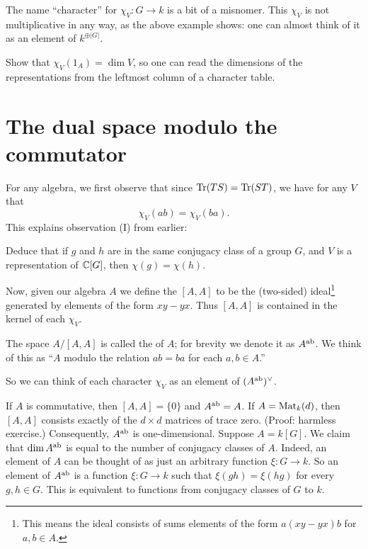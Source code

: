 \begin{abuse}
	The name ``character'' for $\chi_V : G \to k$ is a bit of a misnomer.
	This $\chi_V$ is not multiplicative in any way,
	as the above example shows: one can almost think of it as
	an element of $k^{\oplus |G|}$.
\end{abuse}

\begin{ques}
	Show that $\chi_V(1_A) = \dim V$,
	so one can read the dimensions of the representations
	from the leftmost column of a character table.
\end{ques}

\section{The dual space modulo the commutator}
For any algebra, we first observe that since $\operatorname{Tr}(TS) = \operatorname{Tr}(ST)$,
we have for any $V$ that
\[ \chi_V(ab) = \chi_V(ba). \]
This explains observation (I) from earlier:
\begin{ques}
	Deduce that if $g$ and $h$ are in the same conjugacy class of a 
	group $G$, and $V$ is a representation of $\mathbb C[G]$,
	then $\chi(g) = \chi(h)$.
\end{ques}
Now, given our algebra $A$ we define the  $[A,A]$
to be the (two-sided) ideal\footnote{%
	This means the ideal consists of sums elements of the form
	$a(xy-yx)b$ for $a,b \in A$.
}
generated by elements of the form $xy-yx$.
Thus $[A,A]$ is contained in the kernel of each $\chi_V$.
\begin{definition}
	The space $A / [A,A]$ is called the  of $A$;
	for brevity we denote it as $A^\text{ab}$.
	We think of this as ``$A$ modulo the relation $ab=ba$ for each $a,b \in A$.''
\end{definition}
So we can think of each character $\chi_V$ as an element of $(A^\text{ab})^\vee$.

\begin{example}
	\listhack
	\begin{enumerate}[(a)]
		\ii If $A$ is commutative, then $[A,A] = \{0\}$
		and $A^\text{ab} = A$.
		\ii If $A = \mathrm{Mat}_k(d)$, then $[A,A]$ consists exactly
		of the $d \times d$ matrices of trace zero.
		(Proof: harmless exercise.)
		Consequently, $A^\text{ab}$ is one-dimensional.
		\ii Suppose $A = k[G]$.  We claim that $\dim A^\text{ab}$ is equal to the
		number of conjugacy classes of $A$.
		Indeed, an element of $A$ can be thought of as just 
		an arbitrary function $\xi : G \to k$.
		So an element of $A^\text{ab}$ is a function $\xi: G \to k$ such that
		$\xi(gh) = \xi(hg)$ for every $g,h \in G$.
		This is equivalent to functions from conjugacy classes of $G$ to $k$.
	\end{enumerate}
\end{example}

